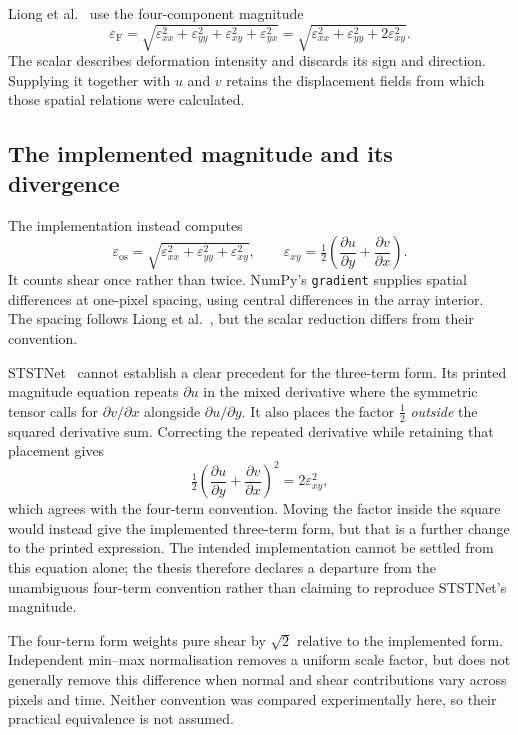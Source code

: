 Liong et al.~\cite{liong2014a,liong2014b,liong2016} use the four-component magnitude
\[
    \varepsilon_{\mathrm{F}}
    =\sqrt{\varepsilon_{xx}^{2}+\varepsilon_{yy}^{2}
        +\varepsilon_{xy}^{2}+\varepsilon_{yx}^{2}}
    =\sqrt{\varepsilon_{xx}^{2}+\varepsilon_{yy}^{2}
        +2\varepsilon_{xy}^{2}}.
\]
The scalar describes deformation intensity and discards its sign and direction. Supplying it together with $u$ and $v$ retains the displacement fields from which those spatial relations were calculated.

\subsection{The implemented magnitude and its divergence}
\label{sec:strain-divergence}

The implementation instead computes
\[
    \varepsilon_{\mathrm{os}}
    =\sqrt{\varepsilon_{xx}^{2}+\varepsilon_{yy}^{2}
        +\varepsilon_{xy}^{2}},
    \qquad
    \varepsilon_{xy}=\tfrac{1}{2}
        \left(\frac{\partial u}{\partial y}
             +\frac{\partial v}{\partial x}\right).
\]
It counts shear once rather than twice. NumPy's \texttt{gradient} supplies spatial differences at one-pixel spacing, using central differences in the array interior. The spacing follows Liong et al.~\cite{liong2014a}, but the scalar reduction differs from their convention.

STSTNet~\cite{liong2019b} cannot establish a clear precedent for the three-term form. Its printed magnitude equation repeats $\partial u$ in the mixed derivative where the symmetric tensor calls for $\partial v/\partial x$ alongside $\partial u/\partial y$. It also places the factor $\tfrac{1}{2}$ \emph{outside} the squared derivative sum. Correcting the repeated derivative while retaining that placement gives
\[
    \tfrac{1}{2}
       \left(\frac{\partial u}{\partial y}
            +\frac{\partial v}{\partial x}\right)^2
       =2\varepsilon_{xy}^{2},
\]
which agrees with the four-term convention. Moving the factor inside the square would instead give the implemented three-term form, but that is a further change to the printed expression. The intended implementation cannot be settled from this equation alone; the thesis therefore declares a departure from the unambiguous four-term convention rather than claiming to reproduce STSTNet's magnitude.

The four-term form weights pure shear by $\sqrt{2}$ relative to the implemented form. Independent min--max normalisation removes a uniform scale factor, but does not generally remove this difference when normal and shear contributions vary across pixels and time. Neither convention was compared experimentally here, so their practical equivalence is not assumed.

